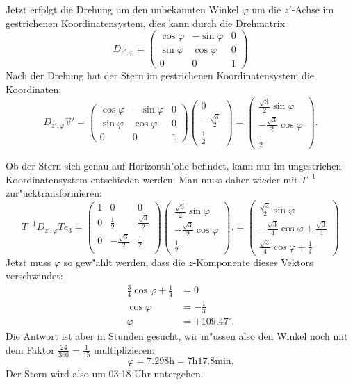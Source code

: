 \begin{loesung}
Jetzt erfolgt die Drehung um den unbekannten Winkel $\varphi$ um
die $z'$-Achse im gestrichenen Koordinatensystem, dies kann durch die
Drehmatrix
\[
D_{z',\varphi}
=
\begin{pmatrix}
\cos\varphi&-\sin\varphi&0\\
\sin\varphi& \cos\varphi&0\\
0&0&1
\end{pmatrix}
\]
Nach der Drehung hat der Stern im gestrichenen Koordinatensystem die
Koordinaten:
\[
D_{z',\varphi}\vec v'
=
\begin{pmatrix}
\cos\varphi&-\sin\varphi&0\\
\sin\varphi& \cos\varphi&0\\
0&0&1
\end{pmatrix}
\begin{pmatrix}
0\\-\frac{\sqrt{3}}2\\\frac12 
\end{pmatrix}
=
\begin{pmatrix}
\frac{\sqrt{3}}2\sin\varphi\\
-\frac{\sqrt{3}}2\cos\varphi\\
\frac12
\end{pmatrix}.
\]

Ob der Stern sich genau auf Horizonth"ohe befindet, kann nur im ungestrichen
Koordinatensystem entschieden werden.
Man muss daher wieder mit $T^{-1}$ zur"ucktransformieren:
\[
T^{-1}D_{z',\varphi}Te_3 = 
\begin{pmatrix}
1& 0&0\\
0&\frac12&\frac{\sqrt{3}}2\\
0&-\frac{\sqrt{3}}2&\frac12\\
\end{pmatrix}
\begin{pmatrix}
\frac{\sqrt{3}}2\sin\varphi\\
-\frac{\sqrt{3}}2\cos\varphi\\
\frac12
\end{pmatrix}.
=
\begin{pmatrix}
\frac{\sqrt{3}}2\sin\varphi\\
-\frac{\sqrt{3}}4\cos\varphi+\frac{\sqrt{3}}4\\
\frac{\sqrt{3}}4\cos\varphi+\frac14
\end{pmatrix}
\]
Jetzt muss $\varphi$ so gew"ahlt werden, dass die $z$-Komponente dieses
Vektors verschwindet:
\begin{align*}
\frac{3}4\cos\varphi+\frac14&=0\\
\cos\varphi&=-\frac1{3}\\
\varphi&=\pm 109.47^\circ.
\end{align*}
Die Antwort ist aber in Stunden gesucht, wir m"ussen also den Winkel
noch mit dem Faktor $\frac{24}{360}=\frac1{15}$ multiplizieren:
\[
\varphi=7.298\text{h}=7\text{h} 17.8\text{min}.
\]
Der Stern wird also um 03:18 Uhr untergehen.
\end{loesung}

